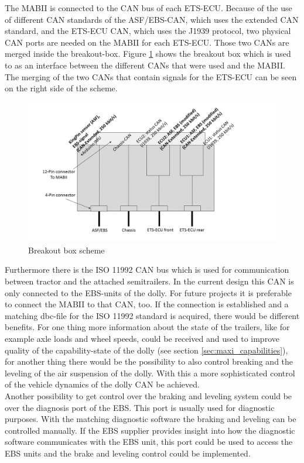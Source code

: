 \documentclass[ExampleMasters.tex]{subfiles}
\begin{document}
The \gls{MABII} is connected to the \gls{CAN} bus of each \gls{ETS}-ECU. Because of the use of different \gls{CAN} standards of the ASF/EBS-\gls{CAN}, which uses the extended \gls{CAN} standard, and the \gls{ETS}-ECU CAN, which uses the J1939 protocol, two physical \gls{CAN} ports are needed on the \gls{MABII} for each \gls{ETS}-\gls{ECU}. Those two \gls{CAN}s are merged inside the breakout-box. Figure \ref{fig:BOB} shows the breakout box which is used to as an interface between the different \gls{CAN}s that were used and the \gls{MABII}. The merging of the two \gls{CAN}s that contain signals for the \gls{ETS}-\gls{ECU} can be seen on the right side of the scheme.\\

\begin{figure}[!htb]
	\centering
	\includegraphics[width=1\linewidth]{figures/BOB_schema}
	\caption{Breakout box scheme}
	\label{fig:BOB}
\end{figure}


	Furthermore there is the ISO 11992 \gls{CAN} bus which is used for communication between tractor and the attached semitrailers. In the current design this \gls{CAN} is only connected to the EBS-units of the dolly. For future projects it is preferable to connect the \gls{MABII} to that \gls{CAN}, too. If the connection is established and a matching dbc-file for the ISO 11992 standard is acquired, there would be different benefits. For one thing more information about the state of the trailers, like for example axle loads and wheel speeds, could be received and used to improve quality of the capability-state of the dolly (see section \ref{sec:maxi_capabilities}), for another thing there would be the possibility to also control breaking and the leveling of the air suspension of the dolly. With this a more sophisticated control of the vehicle dynamics of the dolly \gls{CAN} be achieved.\\
	Another possibility to get control over the braking and leveling system could be over the diagnosis port of the \gls{EBS}. This port is usually used for diagnostic purposes. With the matching diagnostic software the braking and leveling can be controlled manually. If the \gls{EBS} supplier provides insight into how the diagnostic software communicates with the \gls{EBS} unit, this port could be used to access the \gls{EBS} units and the brake and leveling control could be implemented.
	
\end{document}
